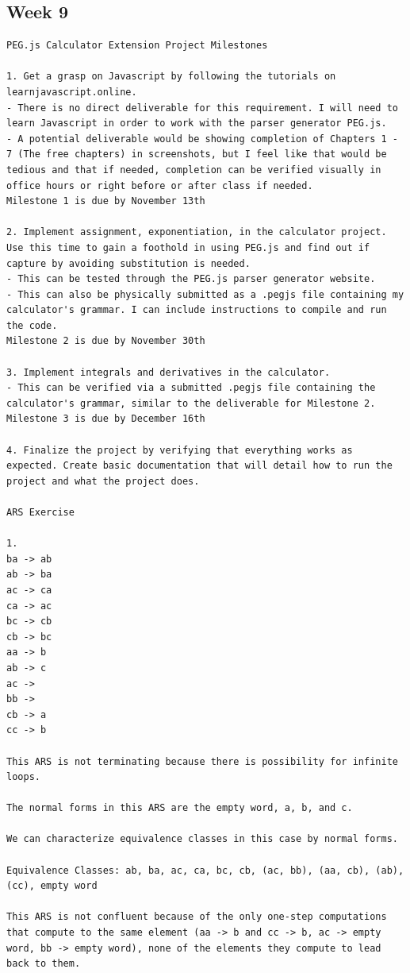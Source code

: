 \documentclass{article}
\theoremstyle{theorem}
\theoremstyle{definition}
\theoremstyle{remark}
\begin{document}
\subsection{Week 9}
\begin{verbatim}
PEG.js Calculator Extension Project Milestones

1. Get a grasp on Javascript by following the tutorials on learnjavascript.online.
- There is no direct deliverable for this requirement. I will need to learn Javascript in order to work with the parser generator PEG.js.
- A potential deliverable would be showing completion of Chapters 1 - 7 (The free chapters) in screenshots, but I feel like that would be tedious and that if needed, completion can be verified visually in office hours or right before or after class if needed.
Milestone 1 is due by November 13th

2. Implement assignment, exponentiation, in the calculator project. Use this time to gain a foothold in using PEG.js and find out if capture by avoiding substitution is needed.
- This can be tested through the PEG.js parser generator website.
- This can also be physically submitted as a .pegjs file containing my calculator's grammar. I can include instructions to compile and run the code.
Milestone 2 is due by November 30th

3. Implement integrals and derivatives in the calculator.
- This can be verified via a submitted .pegjs file containing the calculator's grammar, similar to the deliverable for Milestone 2.
Milestone 3 is due by December 16th

4. Finalize the project by verifying that everything works as expected. Create basic documentation that will detail how to run the project and what the project does.

ARS Exercise

1.
ba -> ab
ab -> ba
ac -> ca
ca -> ac
bc -> cb
cb -> bc
aa -> b
ab -> c
ac ->  
bb ->
cb -> a
cc -> b

This ARS is not terminating because there is possibility for infinite loops.

The normal forms in this ARS are the empty word, a, b, and c.

We can characterize equivalence classes in this case by normal forms. 

Equivalence Classes: ab, ba, ac, ca, bc, cb, (ac, bb), (aa, cb), (ab), (cc), empty word

This ARS is not confluent because of the only one-step computations that compute to the same element (aa -> b and cc -> b, ac -> empty word, bb -> empty word), none of the elements they compute to lead back to them.


\end{verbatim}
\end{document}
